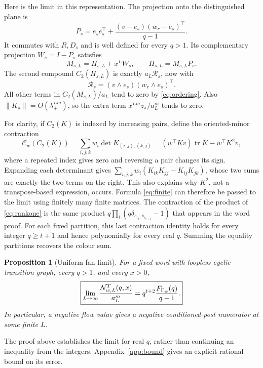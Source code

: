 \documentclass[11pt,a4paper]{article}
\newtheorem{proposition}[theorem]{Proposition}
\theoremstyle{remark}\newtheorem{remark}[theorem]{Remark}
\DeclareMathOperator{\tr}{tr}\DeclareMathOperator{\diag}{diag}
\newcommand{\R}{\mathcal R}\newcommand{\CC}{\mathcal C}
\begin{document}
Here is the limit in this representation. The projection onto the distinguished plane is
\[
P_s=e_se_s^\top+\frac{(v-e_s)(w_r-e_s)^\top}{q-1}.
\]
It commutes with $R,D_s$ and is well defined for every $q>1$. Its complementary projection $W_s=I-P_s$ satisfies
\[
M_{s,L}=H_{s,L}+x^LW_s,\qquad H_{s,L}=M_{s,L}P_s.
\]
The second compound $C_2(H_{s,L})$ is exactly $a_L\R_s$, now with
\begin{equation}\label{eq:rankone}
\R_s=(v\wedge e_s)(w_r\wedge e_s)^\top.
\end{equation}
All other terms in $C_2(M_{s,L})/a_L$ tend to zero by \eqref{eq:ordering}. Also
$\|K_\pi\|=O(\lambda_+^{Lm})$, so the extra term
$x^{Lm}z_\pi/a_L^m$ tends to zero.

For clarity, if $C_2(K)$ is indexed by increasing pairs, define the oriented-minor contraction
\begin{equation}\label{eq:contraction}
\CC_w(C_2(K))=\sum_{i,j,k}w_i\det K_{(i,j),(k,j)}
=(w^\top Kv)\tr K-w^\top K^2v,
\end{equation}
where a repeated index gives zero and reversing a pair changes its sign. Expanding each determinant gives
$\sum_{i,j,k}w_i(K_{ik}K_{jj}-K_{ij}K_{jk})$, whose two sums are exactly the two terms on the right. This also explains why $K^2$, not a transpose-based expression, occurs. Formula \eqref{eq:finite} can therefore be passed to the limit using finitely many finite matrices. The contraction of the product of \eqref{eq:rankone} is the same product $q\prod_i(q\delta_{s_{c_i},s_{c_{i+1}}}-1)$ that appears in the word proof. For each fixed partition, this last contraction identity holds for every integer $q\ge t+1$ and hence polynomially for every real $q$. Summing the equality partitions recovers the colour sum.

\begin{proposition}[Uniform fan limit]\label{prop:fanlimit}
For a fixed word with loopless cyclic transition graph, every $q>1$, and every $x>0$,
\begin{equation}\label{eq:limit}
\boxed{\displaystyle
\lim_{L\to\infty}\frac{\mathcal N_{w,L}^{T}(q,x)}{a_L^m}
=q^{t+2}\frac{F_{\Gamma_w}(q)}{q-1}.}
\end{equation}
In particular, a negative flow value gives a negative conditioned-post numerator at some finite $L$.
\end{proposition}
The proof above establishes the limit for real $q$, rather than continuing an inequality from the integers. Appendix~\ref{app:bound} gives an explicit rational bound on its error.
\end{document}
